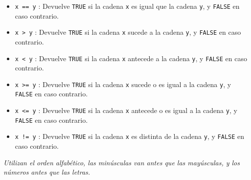 \documentclass[
  a4paper,
]{scrreport}
\providecommand{\tightlist}{%
  \setlength{\itemsep}{0pt}\setlength{\parskip}{0pt}}\usepackage{longtable,booktabs,array}
\theoremstyle{definition}
\theoremstyle{definition}
\theoremstyle{remark}
\begin{document}
\begin{itemize}
\tightlist
\item
  \texttt{x\ ==\ y} : Devuelve \texttt{TRUE} si la cadena \texttt{x} es
  igual que la cadena \texttt{y}, y \texttt{FALSE} en caso contrario.
\item
  \texttt{x\ \textgreater{}\ y} : Devuelve \texttt{TRUE} si la cadena
  \texttt{x} sucede a la cadena \texttt{y}, y \texttt{FALSE} en caso
  contrario.
\item
  \texttt{x\ \textless{}\ y} : Devuelve \texttt{TRUE} si la cadena
  \texttt{x} antecede a la cadena \texttt{y}, y \texttt{FALSE} en caso
  contrario.
\item
  \texttt{x\ \textgreater{}=\ y} : Devuelve \texttt{TRUE} si la cadena
  \texttt{x} sucede o es igual a la cadena \texttt{y}, y \texttt{FALSE}
  en caso contrario.
\item
  \texttt{x\ \textless{}=\ y} : Devuelve \texttt{TRUE} si la cadena
  \texttt{x} antecede o es igual a la cadena \texttt{y}, y
  \texttt{FALSE} en caso contrario.
\item
  \texttt{x\ !=\ y} : Devuelve \texttt{TRUE} si la cadena \texttt{x} es
  distinta de la cadena \texttt{y}, y \texttt{FALSE} en caso contrario.
\end{itemize}

\emph{Utilizan el orden alfabético, las minúsculas van antes que las
mayúsculas, y los números antes que las letras.}
\end{document}
